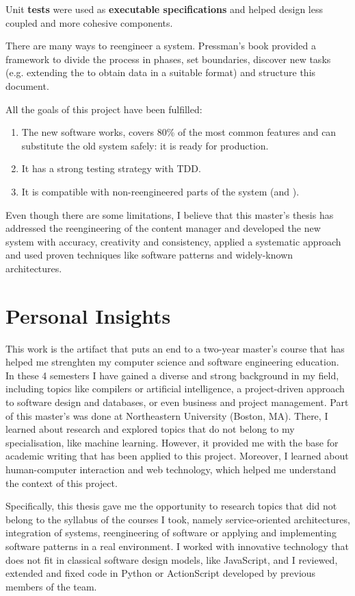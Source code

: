 Unit \textbf{tests} were used as \textbf{executable specifications} and helped design less coupled and more cohesive components.

There are many ways to reengineer a system.
Pressman's book provided a framework to divide the process in phases, set boundaries, discover new tasks (e.g. extending the \flangobe to obtain data in a suitable format) and structure this document.

All the goals of this project have been fulfilled:
\begin{enumerate}
\item The new software works, covers 80\% of the most common features and can substitute the old \flash system safely: it is ready for production.
\item It has a strong testing strategy with \ac{TDD}.
\item It is compatible with non-reengineered parts of the system (\flangobe and \flangofe).
\end{enumerate}

Even though there are some limitations, I believe that this master's thesis has addressed the reengineering of the content manager and developed the new system with accuracy, creativity and consistency, applied a systematic approach and used proven techniques like software patterns and widely-known architectures.


\section{Personal Insights}
This work is the artifact that puts an end to a two-year master's course that has helped me strenghten my computer science and software engineering education.
In these 4 semesters I have gained a diverse and strong background in my field, including topics like compilers or artificial intelligence, a project-driven approach to software design and databases, or even business and project management.
Part of this master's was done at Northeastern University (Boston, MA).
There, I learned about research and explored topics that do not belong to my specialisation, like machine learning.
However, it provided me with the base for academic writing that has been applied to this project.
Moreover, I learned about human-computer interaction and web technology, which helped me understand the context of this project.

Specifically, this thesis gave me the opportunity to research topics that did not belong to the syllabus of the courses I took, namely service-oriented architectures, integration of systems, reengineering of software or applying and implementing software patterns in a real environment.
I worked with innovative technology that does not fit in classical software design models, like JavaScript, and I reviewed, extended and fixed code in Python or ActionScript developed by previous members of the team.

